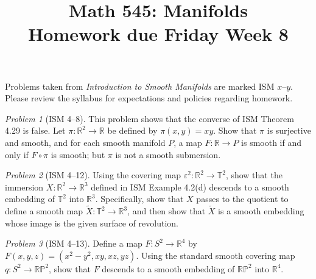 \documentclass[11pt,twoside]{amsart}
\title{Math 545: Manifolds\\ Homework due Friday Week 8}
\theoremstyle{plain}
\theoremstyle{remark}
\newtheorem{prob}{Problem}
\theoremstyle{definition}
\theoremstyle{definition}
\newcommand{\RR}{\mathbb{R}}
\newcommand{\PP}{\mathbb{P}}
\newcommand{\TT}{\mathbb{T}}
\begin{document}
\maketitle

\noindent Problems taken from \emph{Introduction to Smooth Manifolds} are marked ISM $x$--$y$. Please review the syllabus for expectations and policies regarding homework.

\begin{prob}[ISM 4--8]
This problem shows that the converse of ISM Theorem 4.29 is false. Let $\pi\colon \RR^2\to \RR$ be defined by $\pi(x,y)=xy$. Show that $\pi$ is surjective and smooth, and for each smooth manifold $P$, a map $F\colon \RR\to P$ is smooth if and only if $F\circ \pi$ is smooth; but $\pi$ is not a smooth submersion.
\end{prob}

\begin{prob}[ISM 4--12]
Using the covering map $\varepsilon^2\colon \RR^2\to \TT^2$, show that the immersion $X\colon \RR^2\to \RR^3$ defined in ISM Example 4.2(d) descends to a smooth embedding of $\TT^2$ into $\RR^3$. Specifically, show that $X$ passes to the quotient to define a smooth map $\tilde X\colon \TT^2\to \RR^3$, and then show that $\tilde X$ is a smooth embedding whose image is the given surface of revolution.
\end{prob}

\begin{prob}[ISM 4--13]
Define a map $F\colon S^2\to \RR^4$ by $F(x,y,z) = (x^2-y^2,xy,xz,yz)$. Using the standard smooth covering map $q\colon S^2\to \RR\PP^2$, show that $F$ descends to a smooth embedding of $\RR\PP^2$ into $\RR^4$.
\end{prob}
\end{document}

